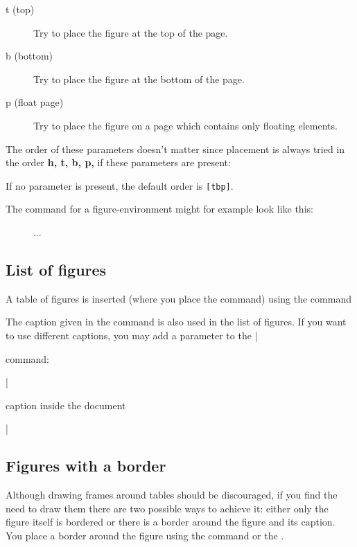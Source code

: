 \begin{dispListing}
\begin{description}
\item [t (top)] Try to place the figure at the top of the page.

\item[b (bottom)] Try to place the figure at the bottom of the page.

\item [p (float page)] Try to place the figure on a page which contains only floating elements.
\end{description}

The order of these parameters doesn't matter since placement is always tried in the order \textbf{h, t, b, p,} if these parameters are present:

If no parameter is present, the default order is  \texttt{[tbp]}.


The command for a figure-environment might for example look like this:

\begin{teX}
\begin{figure}[htbp]
...
\end{figure}
\end{teX}



\subsection{List of figures}
A table of figures is inserted (where you place the command) using the command


\begin{teX}
   \listoffigures
\end{teX}

The caption given in the  command is also used in the list of figures. 
If you want to use different captions, you may add a parameter to the |\caption| command:

|\caption[caption for listoffigures]{caption inside the document}|


\subsection{Figures with a border}

Although drawing frames around tables should be discouraged, if you find the need
to draw them there are  two possible ways to achieve it: either only the figure itself is bordered or there is a border around the figure and its caption. You place a border around the figure using the \cmd{\fbox} command or the \cmd{\framebox}.



\end{dispListing}
